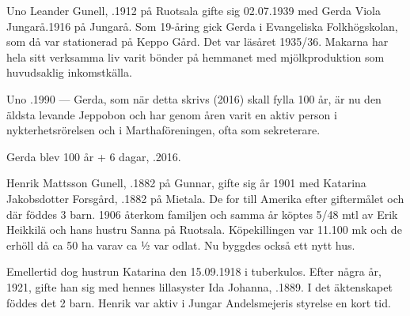 Uno Leander Gunell, .1912 på Ruotsala gifte sig 02.07.1939 med Gerda Viola Jungarå.1916 på Jungarå. Som 19-åring gick Gerda i Evangeliska Folkhögskolan, som då var stationerad på Keppo Gård. Det var läsåret 1935/36. Makarna har hela sitt verksamma liv varit bönder på hemmanet med mjölkproduktion som huvudsaklig inkomstkälla.
\begin{jhchildren}
  \item {}
  \item {}
\end{jhchildren}

Uno .1990 ---  Gerda, som när detta skrivs (2016) skall fylla 100 år, är nu den äldsta levande Jeppobon och har genom åren varit en aktiv person i nykterhetsrörelsen och i Marthaföreningen, ofta som sekreterare.

Gerda blev 100 år + 6 dagar, .2016.





Henrik Mattsson Gunell, .1882 på Gunnar, gifte sig år 1901 med Katarina Jakobsdotter Forsgård, .1882 på Mietala. De for till Amerika efter giftermålet och där föddes 3 barn. 1906 återkom familjen och samma år köptes 5/48 mtl av Erik Heikkilä och hans hustru Sanna på Ruotsala. Köpekillingen var 11.100 mk och de erhöll då ca 50 ha varav ca ½ var odlat. Nu byggdes också ett nytt hus.

Emellertid dog hustrun Katarina den 15.09.1918 i tuberkulos. Efter några år, 1921, gifte han sig med hennes lillasyster Ida Johanna, .1889. I det äktenskapet föddes det 2 barn. Henrik var aktiv i Jungar Andelsmejeris styrelse en kort tid.
\begin{jhchildren}
  \item {}
  \item {}
  \item {}
  \item {}
  \item {}
  \item {}
  \item {}
\end{jhchildren}

